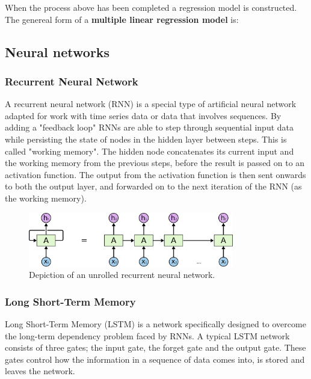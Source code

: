 When the process above has been completed a regression model is constructed. The genereal form of a \textbf{multiple linear regression model} is:  

\subsection{Neural networks}
\subsubsection{Recurrent Neural Network}
A recurrent neural network (RNN) is a special type of artificial neural network adapted for work with time series data or data that involves sequences. \parencite{saeed_2021} 
By adding a "feedback loop" RNNs are able to step through sequential input data while persisting the state of nodes in the hidden layer between steps. This is called "working memory". The hidden node concatenates its current input and the working memory from the previous steps, before the result is passed on to an activation function. The output from the activation function is then sent onwards to both the output layer, and forwarded on to the next iteration of the RNN (as the working memory).~\parencite{bouvet_2020}

\begin{figure}[H]
    \centering
    \includegraphics[width=0.8\textwidth]{data/Figures/Neural networks/RNN.png}
    \caption[Depiction of an unrolled recurrent neural network]{Depiction of an unrolled recurrent neural network.~\cite{khalajani_2023}}\label{fig:RNN}
\end{figure}

\subsubsection{Long Short-Term Memory} 
Long Short-Term Memory (LSTM) is a network specifically designed to overcome the long-term dependency problem faced by RNNs. 
A typical LSTM network consists of three gates; the input gate, the forget gate and the output gate.
These gates control how the information in a sequence of data comes into, is stored and leaves the network.  

